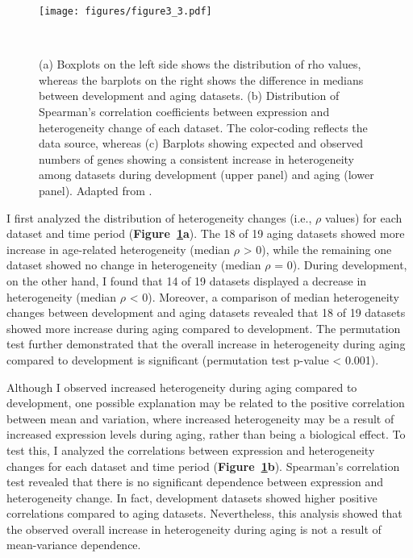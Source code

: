 \begin{figure}[!ht]
    \centering
    \texttt{[image: figures/figure3\_3.pdf]}
    \caption{(a) Boxplots on the left side shows the distribution of rho values, 
    whereas the barplots on the right shows the difference in medians between development and aging datasets.
    (b) Distribution of Spearman's correlation coefficients between expression and heterogeneity change of each dataset. 
    The color-coding reflects the data source, whereas 
    (c) Barplots showing expected and observed numbers of genes showing a consistent increase in heterogeneity among datasets during development (upper panel) and aging (lower panel).
    Adapted from \autocite{Isildak2020}.
    }~\label{fig:fig3.3}
\end{figure}

I first analyzed the distribution of heterogeneity changes (i.e., $\rho$ values) for each dataset and time period (\textbf{Figure~\ref{fig:fig3.3}a}).
The 18 of 19 aging datasets showed more increase in age-related heterogeneity (median $\rho$ > 0), 
while the remaining one dataset showed no change in heterogeneity (median $\rho$ = 0). 
During development, on the other hand, I found that 14 of 19 datasets displayed a decrease in heterogeneity  (median $\rho$ < 0).
Moreover, a comparison of median heterogeneity changes between development and aging datasets revealed that 
18 of 19 datasets showed more increase during aging compared to development. 
The permutation test further demonstrated that the overall increase in heterogeneity during aging compared to development is significant (permutation test p-value < 0.001).

Although I observed increased heterogeneity during aging compared to development, 
one possible explanation may be related to the positive correlation between mean and variation, 
where increased heterogeneity may be a result of increased expression levels during aging, rather than being a biological effect.
To test this, I analyzed the correlations between expression and heterogeneity changes for each dataset and time period (\textbf{Figure~\ref{fig:fig3.3}b}).
Spearman's correlation test revealed that there is no significant dependence between expression and heterogeneity change.
In fact, development datasets showed higher positive correlations compared to aging datasets. 
Nevertheless, this analysis showed that the observed overall increase in heterogeneity during aging is not a result of mean-variance dependence.

